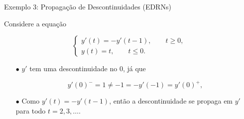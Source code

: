 \documentclass{beamer}
\theoremstyle{plain}
\theoremstyle{definition}
\begin{document}

\begin{frame}{Exemplo 3: Propagação de Descontinuidades (EDRNs)}

     Considere a equação 

     \begin{equation}
       \begin{cases}
          y'(t) = -y'(t - 1), \qquad t \geq 0,  \\
          y(t) = t, \qquad t \leq 0.
       \end{cases}
      \label{chap1:ex5:eq:1}
     \end{equation}

     \begin{itemize}
         \item[$\bullet$] $y'$ tem uma descontinuidade no 0, já que

             \[
                 y'(0)^- = 1 \neq -1 = - y'(-1) = y'(0)^+,
             \]

         \item[$\bullet$] Como $y'(t) = -y'(t - 1)$, então a descontinuidade se propaga em $y'$ para todo $t = 2, 3, \dots$. 

     \end{itemize}

\end{frame}

\end{document}
